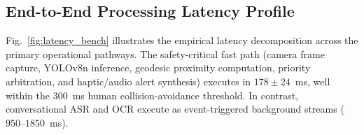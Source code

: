 \documentclass[conference]{IEEEtran}
\begin{document}
\begin{table}[htbp]
\caption{Module-Level Analytical Accuracy, Memory Footprint, and Latency}
\label{tab:benchmarks_full}
\centering
{}
\end{table}

\subsection{End-to-End Processing Latency Profile}
Fig.~\ref{fig:latency_bench} illustrates the empirical latency decomposition across the primary operational pathways. The safety-critical fast path (camera frame capture, YOLOv8n inference, geodesic proximity computation, priority arbitration, and haptic/audio alert synthesis) executes in $178\pm 24$~ms, well within the 300~ms human collision-avoidance threshold. In contrast, conversational ASR and OCR execute as event-triggered background streams ($950$--$1850$~ms).
\end{document}
